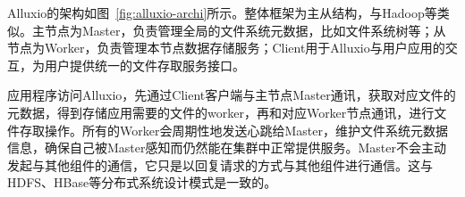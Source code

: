 \par Alluxio的架构如图~\ref{fig:alluxio-archi}所示。整体框架为主从结构，与Hadoop\cite{hdfs}等类似。主节点为Master，负责管理全局的文件系统元数据，比如文件系统树等；从节点为Worker，负责管理本节点数据存储服务；Client用于Alluxio与用户应用的交互，为用户提供统一的文件存取服务接口。

\par 应用程序访问Alluxio，先通过Client客户端与主节点Master通讯，获取对应文件的元数据，得到存储应用需要的文件的worker，再和对应Worker节点通讯，进行文件存取操作。所有的Worker会周期性地发送心跳给Master，维护文件系统元数据信息，确保自己被Master感知而仍然能在集群中正常提供服务。Master不会主动发起与其他组件的通信，它只是以回复请求的方式与其他组件进行通信。这与HDFS、HBase等分布式系统设计模式是一致的。
